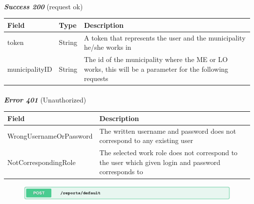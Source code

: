 						\paragraph{}
							\textcolor{myGreen}{\textit{\textbf{Success 200}}} (request ok)
							\vspace{-2mm}
							\begin{table}[!h]
								\begin{tabular}{L{0.25\textwidth}L{0.1\textwidth}L{0.53\textwidth}}
									\toprule
									\textbf{Field} & \textbf{Type} & \textbf{Description} \\
									\midrule
									token & String & A token that represents the user and the municipality he/she works in \\
									municipalityID & String & The id of the municipality where the ME or LO works, this will be a parameter for the following requests \\
								 	\bottomrule
								\end{tabular}
							\end{table}
						\vspace{-5mm}
						\paragraph{}
							\textcolor{myRed}{\textit{\textbf{Error 401}}} (Unauthorized)
							\vspace{-2mm}
							\begin{table}[!h]
								\begin{tabular}{L{0.4\textwidth}L{0.52\textwidth}}
									\toprule
									\textbf{Field} & \textbf{Description} \\
									\midrule
								  	WrongUsernameOrPassword & The written username and password does not correspond to any existing user \\
								  	NotCorrespondingRole & The selected work role does not correspond to the user which given login and password corresponds to \\
								 	\bottomrule
								\end{tabular}
							\end{table}
							
						\clearpage
						\begin{figure}[!h]
						\includegraphics[width=\textwidth]{images/Restful/AddReport}
						\end{figure}

